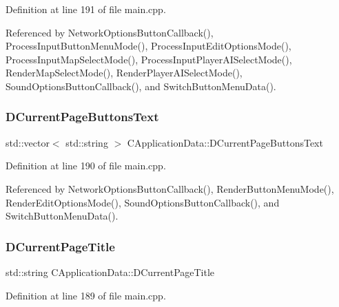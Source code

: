 Definition at line 191 of file main.\+cpp.



Referenced by Network\+Options\+Button\+Callback(), Process\+Input\+Button\+Menu\+Mode(), Process\+Input\+Edit\+Options\+Mode(), Process\+Input\+Map\+Select\+Mode(), Process\+Input\+Player\+A\+I\+Select\+Mode(), Render\+Map\+Select\+Mode(), Render\+Player\+A\+I\+Select\+Mode(), Sound\+Options\+Button\+Callback(), and Switch\+Button\+Menu\+Data().

\hypertarget{classCApplicationData_af04b7f5f8ba4e5c99c0a3530055fc15d}{}\label{classCApplicationData_af04b7f5f8ba4e5c99c0a3530055fc15d} 
\subsubsection{\texorpdfstring{D\+Current\+Page\+Buttons\+Text}{DCurrentPageButtonsText}}
{\footnotesize\ttfamily std\+::vector$<$ std\+::string $>$ C\+Application\+Data\+::\+D\+Current\+Page\+Buttons\+Text\hspace{0.3cm}{\ttfamily [protected]}}



Definition at line 190 of file main.\+cpp.



Referenced by Network\+Options\+Button\+Callback(), Render\+Button\+Menu\+Mode(), Render\+Edit\+Options\+Mode(), Sound\+Options\+Button\+Callback(), and Switch\+Button\+Menu\+Data().

\hypertarget{classCApplicationData_a49ce7f0b5891f0f2c29b73aad636b761}{}\label{classCApplicationData_a49ce7f0b5891f0f2c29b73aad636b761} 
\subsubsection{\texorpdfstring{D\+Current\+Page\+Title}{DCurrentPageTitle}}
{\footnotesize\ttfamily std\+::string C\+Application\+Data\+::\+D\+Current\+Page\+Title\hspace{0.3cm}{\ttfamily [protected]}}



Definition at line 189 of file main.\+cpp.



